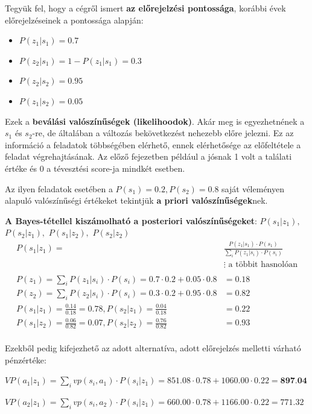 \documentclass[a4paper,12pt]{article}
\begin{document}
Tegyük fel, hogy a cégről ismert \textbf{az előrejelzési pontossága}, korábbi évek előrejelzéseinek a pontossága alapján:
\begin{itemize}
\item $P(z_{1}|s_1) = 0.7$
\item $P(z_{2}|s_1) = 1- P(z_{1}|s_1) = 0.3$
\item $P(z_{2}|s_2) = 0.95$
\item $P(z_{1}|s_2) = 0.05$
\end{itemize}
Ezek a \textbf{beválási valószínűségek (likelihoodok)}.
Akár meg is egyezhetnének a $s_1$ és $s_2$-re, de általában a változás bekövetkezést nehezebb előre jelezni.
Ez az információ a feladatok többségében elérhető, ennek elérhetősége az előfeltétele a feladat végrehajtásának.
Az előző fejezetben például a jósnak 1 volt a találati értéke és 0 a tévesztési score-ja mindkét esetben.

Az ilyen feladatok esetében a $P(s_1) = 0.2 , P(s_2) = 0.8$ saját véleményen alapuló valószínűségi értékeket tekintjük
\textbf{a priori valószínűségek}nek.

\textbf{A Bayes-tétellel kiszámolható a posteriori valószínűségeket}: $P(s_1|z_1),$ $P(s_2|z_1),$ $ P(s_1|z_2),$ $P(s_2|z_2)$
\begin{equation}
\begin{split}
P(s_1|z_1) =& \frac{P(z_{1}|s_1) \cdot  P(s_1)}{\sum_{i}^{ } P(z_{1}|s_i) \cdot  P(s_i)} \\
&\vdots \text{ a többit hasnolóan} \\
\\
P(z_1)=\sum_{i}^{ } P(z_{1}|s_i) \cdot  P(s_i) =  0.7\cdot 0.2 + 0.05\cdot 0.8 &= 0.18 \\
P(z_2)=\sum_{i}^{ } P(z_{2}|s_i) \cdot  P(s_i) =  0.3\cdot 0.2 + 0.95\cdot 0.8 &= 0.82 \\
P(s_1|z_1) = \frac{0.14}{0.18} = 0.78,
P(s_2|z_1) = \frac{0.04}{0.18} &= 0.22 \\
P(s_1|z_2) = \frac{0.06}{0.82} = 0.07,
P(s_2|z_2) = \frac{0.76}{0.82} &= 0.93
\\
\end{split}
\end{equation}

Ezekből pedig kifejezhető az adott alternatíva, adott előrejelzés melletti várható pénzértéke:

$VP(a_1|z_1) = \sum_{i}^{ }vp(s_i,a_1)\cdot P(s_i|z_1) = 851.08\cdot 0.78 + 1060.00\cdot 0.22 = \textbf{897.04}$
 
$VP(a_2|z_1) = \sum_{i}vp(s_i,a_2)\cdot P(s_i|z_1) = 660.00\cdot 0.78 + 1166.00\cdot 0.22 = 771.32$
\end{document}

